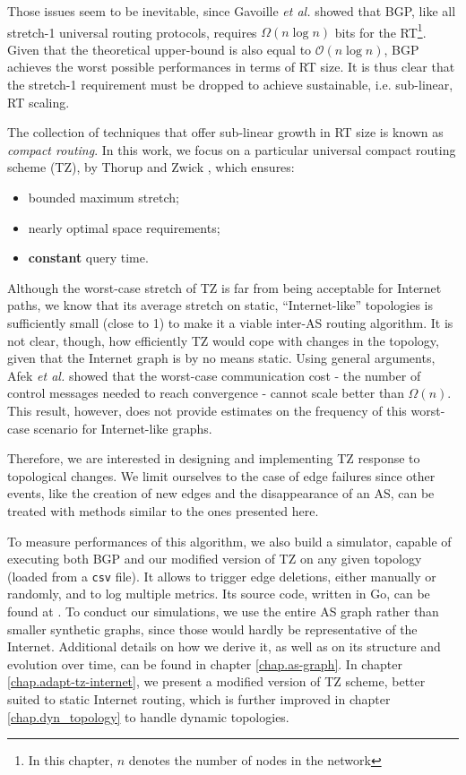 \documentclass[a4paper,11pt,oneside]{report}
\begin{document}
\bigskip
Those issues seem to be inevitable, since Gavoille \textit{et al.} \cite{gavoilleMemoryRequirementRouting1996} showed that BGP, like all stretch-1 universal routing protocols, requires $\Omega(n\log n)$ bits for the RT\footnote{In this chapter, $n$ denotes the number of nodes in the network}. Given that the theoretical upper-bound is also equal to $\mathcal{O}(n\log n)$, BGP achieves the worst possible performances in terms of RT size. It is thus clear that the stretch-1 requirement must be dropped to achieve sustainable, i.e. sub-linear, RT scaling.

The collection of techniques that offer sub-linear growth in RT size is known as \emph{compact routing}.
In this work, we focus on a particular universal compact routing scheme (TZ), by Thorup and Zwick \cite{thorupApproximateDistanceOracles2005}, which ensures:
\begin{itemize}
\item bounded maximum stretch;
\item nearly optimal space requirements;
\item \textbf{constant} query time.
\end{itemize}

Although the worst-case stretch of TZ is far from being acceptable for Internet paths, we know \cite{krioukovCompactRoutingInternet2007} that its average stretch on static, ``Internet-like'' topologies is sufficiently small (close to 1) to make it a viable inter-AS routing algorithm. It is not clear, though, how efficiently TZ would cope with changes in the topology, given that the Internet graph is by no means static. Using general arguments, Afek \textit{et al.} \cite{afekUpperLowerBounds1989} showed that the worst-case communication cost - the number of control messages needed to reach convergence - cannot scale better than $\Omega(n)$.
This result, however, does not provide estimates on the frequency of this worst-case scenario for Internet-like graphs.

\bigskip
Therefore, we are interested in designing and implementing TZ response to topological changes. We limit ourselves to the case of edge failures since other events, like the creation of new edges and the disappearance of an AS, can be treated with methods similar to the ones presented here.

To measure performances of this algorithm, we also build a simulator, capable of executing both BGP and our modified version of TZ on any given topology (loaded from a \texttt{csv} file). It allows to trigger edge deletions, either manually or randomly, and to log multiple metrics. Its source code, written in Go, can be found at \cite{RoutingAlgorithmsSimulator}. To conduct our simulations, we use the entire AS graph rather than smaller synthetic graphs, since those would hardly be representative of the Internet. Additional details on how we derive it, as well as on its structure and evolution over time, can be found in chapter \ref{chap.as-graph}.
In chapter \ref{chap.adapt-tz-internet}, we present a modified version of TZ scheme, better suited to static Internet routing, which is further improved in chapter \ref{chap.dyn_topology} to handle dynamic topologies.
\end{document}
